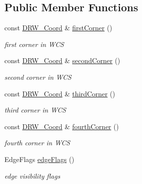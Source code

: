 \subsection*{Public Member Functions}
\begin{DoxyCompactItemize}
\item 
\hypertarget{class_d_r_w__3_dface_a56da97e5084ecff4a44fb96d268d32e6}{}const \hyperlink{class_d_r_w___coord}{D\+R\+W\+\_\+\+Coord} \& \hyperlink{class_d_r_w__3_dface_a56da97e5084ecff4a44fb96d268d32e6}{first\+Corner} ()\label{class_d_r_w__3_dface_a56da97e5084ecff4a44fb96d268d32e6}

\begin{DoxyCompactList}\small\item\em first corner in W\+C\+S \end{DoxyCompactList}\item 
\hypertarget{class_d_r_w__3_dface_a721316b57f076fb50ccd3117262519d6}{}const \hyperlink{class_d_r_w___coord}{D\+R\+W\+\_\+\+Coord} \& \hyperlink{class_d_r_w__3_dface_a721316b57f076fb50ccd3117262519d6}{second\+Corner} ()\label{class_d_r_w__3_dface_a721316b57f076fb50ccd3117262519d6}

\begin{DoxyCompactList}\small\item\em second corner in W\+C\+S \end{DoxyCompactList}\item 
\hypertarget{class_d_r_w__3_dface_ac88a266080ba7edfd54cb3c05097df2d}{}const \hyperlink{class_d_r_w___coord}{D\+R\+W\+\_\+\+Coord} \& \hyperlink{class_d_r_w__3_dface_ac88a266080ba7edfd54cb3c05097df2d}{third\+Corner} ()\label{class_d_r_w__3_dface_ac88a266080ba7edfd54cb3c05097df2d}

\begin{DoxyCompactList}\small\item\em third corner in W\+C\+S \end{DoxyCompactList}\item 
\hypertarget{class_d_r_w__3_dface_aba1e46ff30324167bfac371ace58a2f9}{}const \hyperlink{class_d_r_w___coord}{D\+R\+W\+\_\+\+Coord} \& \hyperlink{class_d_r_w__3_dface_aba1e46ff30324167bfac371ace58a2f9}{fourth\+Corner} ()\label{class_d_r_w__3_dface_aba1e46ff30324167bfac371ace58a2f9}

\begin{DoxyCompactList}\small\item\em fourth corner in W\+C\+S \end{DoxyCompactList}\item 
\hypertarget{class_d_r_w__3_dface_a7f7325421bb47d3e335e9e41237cf71d}{}Edge\+Flags \hyperlink{class_d_r_w__3_dface_a7f7325421bb47d3e335e9e41237cf71d}{edge\+Flags} ()\label{class_d_r_w__3_dface_a7f7325421bb47d3e335e9e41237cf71d}

\begin{DoxyCompactList}\small\item\em edge visibility flags \end{DoxyCompactList}\end{DoxyCompactItemize}
